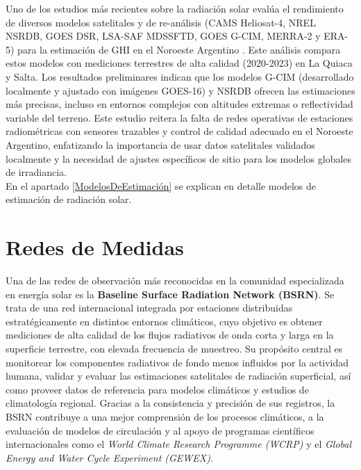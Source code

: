 Uno de los estudios más recientes sobre la radiación solar evalúa el rendimiento de diversos modelos satelitales y de re-análisis (CAMS Heliosat-4, NREL NSRDB, GOES DSR, LSA-SAF MDSSFTD, GOES G-CIM, MERRA-2 y ERA-5) para la estimación de GHI en el Noroeste Argentino \cite{Ledesma2025}. Este análisis compara estos modelos con mediciones terrestres de alta calidad (2020-2023) en La Quiaca y Salta. Los resultados preliminares indican que los modelos G-CIM (desarrollado localmente y ajustado con imágenes GOES-16) y NSRDB ofrecen las estimaciones más precisas, incluso en entornos complejos con altitudes extremas o reflectividad variable del terreno. Este estudio reitera la falta de redes operativas de estaciones radiométricas con sensores trazables y control de calidad adecuado en el Noroeste Argentino, enfatizando la importancia de usar datos satelitales validados localmente y la necesidad de ajustes específicos de sitio para los modelos globales de irradiancia.\\

En el apartado \ref{ModelosDeEstimación} se explican en detalle modelos de estimación de radiación solar.

\section{Redes de Medidas}

Una de las redes de observación más reconocidas en la comunidad especializada en energía solar es la \textbf{Baseline Surface Radiation Network (BSRN)}. Se trata de una red internacional integrada por estaciones distribuidas estratégicamente en distintos entornos climáticos, cuyo objetivo es obtener mediciones de alta calidad de los flujos radiativos de onda corta y larga en la superficie terrestre, con elevada frecuencia de muestreo. Su propósito central es monitorear los componentes radiativos de fondo menos influidos por la actividad humana, validar y evaluar las estimaciones satelitales de radiación superficial, así como proveer datos de referencia para modelos climáticos y estudios de climatología regional. Gracias a la consistencia y precisión de sus registros, la BSRN contribuye a una mejor comprensión de los procesos climáticos, a la evaluación de modelos de circulación y al apoyo de programas científicos internacionales como el \textit{World Climate Research Programme (WCRP)} y el \textit{Global Energy and Water Cycle Experiment (GEWEX)}.

